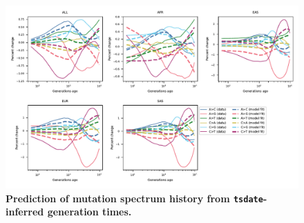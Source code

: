\documentclass[]{article}
\newcommand{\tsdate}{\texttt{tsdate}\xspace}
\begin{document}
\begin{figure}[ht!]
    \centering
    \includegraphics[width=\textwidth]{../plots/goodness-of-fit.DM.tsdate.max_age.10000.pdf}
    \caption{
        \textbf{Prediction of mutation spectrum history from
        \tsdate-inferred generation times.}
    }
    \label{fig:tsdate-fit}
\end{figure}


\break
\end{document}
